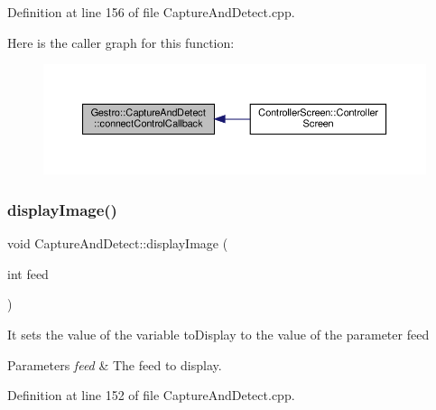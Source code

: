 Definition at line 156 of file Capture\+And\+Detect.\+cpp.

Here is the caller graph for this function\+:
\nopagebreak
\begin{figure}[H]
\begin{center}
\leavevmode
\includegraphics[width=350pt]{class_gestro_1_1_capture_and_detect_aa75e3ba836797d18aa02c72bbf975082_icgraph}
\end{center}
\end{figure}
\mbox{\label{class_gestro_1_1_capture_and_detect_a3f1ba69514a2debbc6b2a03e76f31b65}} 
\subsubsection{\texorpdfstring{display\+Image()}{displayImage()}}
{\footnotesize\ttfamily void Capture\+And\+Detect\+::display\+Image (\begin{DoxyParamCaption}\item[{int}]{feed }\end{DoxyParamCaption})}

It sets the value of the variable to\+Display to the value of the parameter feed


\begin{DoxyParams}{Parameters}
{\em feed} & The feed to display. \\
\hline
\end{DoxyParams}


Definition at line 152 of file Capture\+And\+Detect.\+cpp.

\mbox{\label{class_gestro_1_1_capture_and_detect_a1df110dc696cebc95eb5d7ead2d74447}} 
